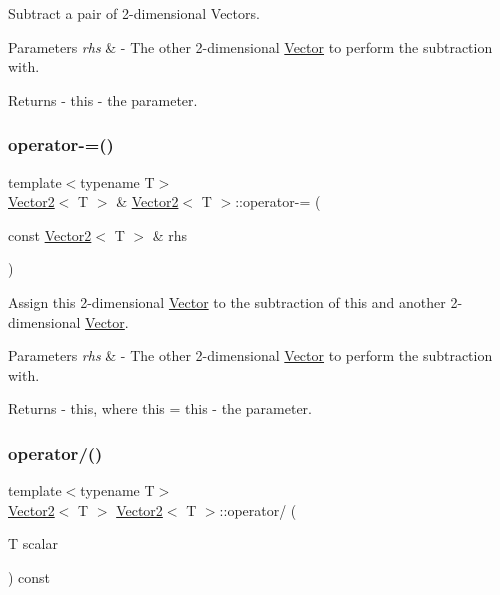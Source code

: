Subtract a pair of 2-\/dimensional Vectors. 
\begin{DoxyParams}{Parameters}
{\em rhs} & -\/ The other 2-\/dimensional \mbox{\hyperlink{class_vector}{Vector}} to perform the subtraction with. \\
\hline
\end{DoxyParams}
\begin{DoxyReturn}{Returns}
-\/ this -\/ the parameter. 
\end{DoxyReturn}
\mbox{\label{class_vector2_a1722e051fa3c354749c2c4c5c14b9c8e}} 
\subsubsection{\texorpdfstring{operator-\/=()}{operator-=()}}
{\footnotesize\ttfamily template$<$typename T$>$ \\
\mbox{\hyperlink{class_vector2}{Vector2}}$<$ T $>$ \& \mbox{\hyperlink{class_vector2}{Vector2}}$<$ T $>$\+::operator-\/= (\begin{DoxyParamCaption}\item[{const \mbox{\hyperlink{class_vector2}{Vector2}}$<$ T $>$ \&}]{rhs }\end{DoxyParamCaption})}

Assign this 2-\/dimensional \mbox{\hyperlink{class_vector}{Vector}} to the subtraction of this and another 2-\/dimensional \mbox{\hyperlink{class_vector}{Vector}}. 
\begin{DoxyParams}{Parameters}
{\em rhs} & -\/ The other 2-\/dimensional \mbox{\hyperlink{class_vector}{Vector}} to perform the subtraction with. \\
\hline
\end{DoxyParams}
\begin{DoxyReturn}{Returns}
-\/ this, where \textquotesingle{}this = this -\/ the parameter\textquotesingle{}. 
\end{DoxyReturn}
\mbox{\label{class_vector2_aae901abf0c2c7f0c772d8cb69213f628}} 
\subsubsection{\texorpdfstring{operator/()}{operator/()}}
{\footnotesize\ttfamily template$<$typename T$>$ \\
\mbox{\hyperlink{class_vector2}{Vector2}}$<$ T $>$ \mbox{\hyperlink{class_vector2}{Vector2}}$<$ T $>$\+::operator/ (\begin{DoxyParamCaption}\item[{T}]{scalar }\end{DoxyParamCaption}) const}

